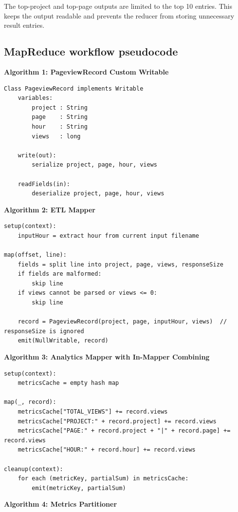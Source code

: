\documentclass[12pt,a4paper]{report}
\begin{document}
The top-project and top-page outputs are limited to the top 10 entries. This keeps the output readable and prevents the reducer from storing unnecessary result entries.

\subsection{MapReduce workflow pseudocode}

\textbf{Algorithm 1: PageviewRecord Custom Writable}

\begin{verbatim}
Class PageviewRecord implements Writable
    variables:
        project : String
        page    : String
        hour    : String
        views   : long

    write(out):
        serialize project, page, hour, views

    readFields(in):
        deserialize project, page, hour, views
\end{verbatim}

\textbf{Algorithm 2: ETL Mapper}

\begin{verbatim}
setup(context):
    inputHour = extract hour from current input filename

map(offset, line):
    fields = split line into project, page, views, responseSize
    if fields are malformed:
        skip line
    if views cannot be parsed or views <= 0:
        skip line

    record = PageviewRecord(project, page, inputHour, views)  // responseSize is ignored
    emit(NullWritable, record)
\end{verbatim}

\textbf{Algorithm 3: Analytics Mapper with In-Mapper Combining}

\begin{verbatim}
setup(context):
    metricsCache = empty hash map

map(_, record):
    metricsCache["TOTAL_VIEWS"] += record.views
    metricsCache["PROJECT:" + record.project] += record.views
    metricsCache["PAGE:" + record.project + "|" + record.page] += record.views
    metricsCache["HOUR:" + record.hour] += record.views

cleanup(context):
    for each (metricKey, partialSum) in metricsCache:
        emit(metricKey, partialSum)
\end{verbatim}

\textbf{Algorithm 4: Metrics Partitioner}
\end{document}
